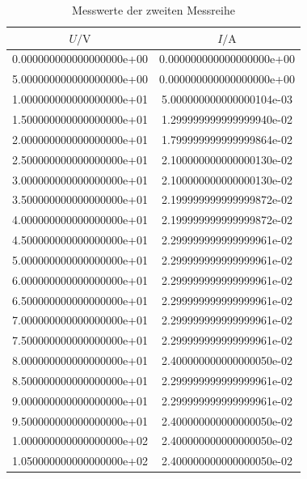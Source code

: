 \begin{table}
  \centering
  \caption{Messwerte der zweiten Messreihe}
  \label{tab:Reihe2}
  \begin{tabular}{|S|S|}
    \toprule
    $U/\si{\volt}$ & $I/\si{\ampere}$ \\
    \midrule
    0.000000000000000000e+00 & 0.000000000000000000e+00\\
    5.000000000000000000e+00 & 0.000000000000000000e+00\\
    1.000000000000000000e+01 & 5.000000000000000104e-03\\
    1.500000000000000000e+01 & 1.299999999999999940e-02\\
    2.000000000000000000e+01 & 1.799999999999999864e-02\\
    2.500000000000000000e+01 & 2.100000000000000130e-02\\
    3.000000000000000000e+01 & 2.100000000000000130e-02\\
    3.500000000000000000e+01 & 2.199999999999999872e-02\\
    4.000000000000000000e+01 & 2.199999999999999872e-02\\
    4.500000000000000000e+01 & 2.299999999999999961e-02\\
    5.000000000000000000e+01 & 2.299999999999999961e-02\\
    6.000000000000000000e+01 & 2.299999999999999961e-02\\
    6.500000000000000000e+01 & 2.299999999999999961e-02\\
    7.000000000000000000e+01 & 2.299999999999999961e-02\\
    7.500000000000000000e+01 & 2.299999999999999961e-02\\
    8.000000000000000000e+01 & 2.400000000000000050e-02\\
    8.500000000000000000e+01 & 2.299999999999999961e-02\\
    9.000000000000000000e+01 & 2.299999999999999961e-02\\
    9.500000000000000000e+01 & 2.400000000000000050e-02\\
    1.000000000000000000e+02 & 2.400000000000000050e-02\\
    1.050000000000000000e+02 & 2.400000000000000050e-02\\
    \bottomrule
  \end{tabular}
\end{table}

